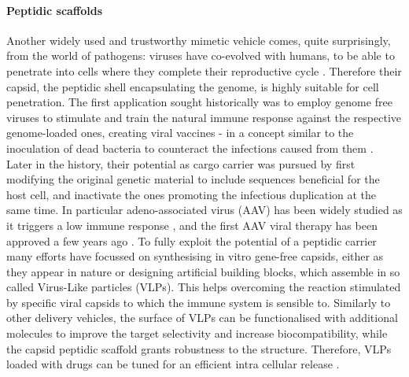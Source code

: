 \paragraph{Peptidic scaffolds} Another widely used and trustworthy mimetic vehicle comes, quite surprisingly, from the world of pathogens: viruses have co-evolved with humans, to be able to penetrate into cells where they complete their reproductive cycle \cite{Lobo2009}. Therefore their capsid, the peptidic shell encapsulating the genome, is highly suitable for cell penetration. The first application sought historically was to employ genome free viruses to stimulate and train the natural immune response against the respective genome-loaded ones, creating viral vaccines - in a concept similar to the inoculation of dead bacteria to counteract the infections caused from them \cite{Lauer2017}.
Later in the history, their potential as cargo carrier was pursued by first modifying the original genetic material to include sequences beneficial for the host cell, and inactivate the ones promoting the infectious duplication at the same time. In particular adeno-associated virus (AAV) has been widely studied \cite{Daya2008} as it triggers a low immune response \cite{Buning2015}, and the first AAV viral therapy has been approved a few years ago \cite{Smalley2017}.
%
To fully exploit the potential of a peptidic carrier many efforts have focussed on synthesising in vitro gene-free capsids, either as they appear in nature \cite{Wu2009} or designing artificial building blocks, which assemble in so called Virus-Like particles (VLPs). This helps overcoming the reaction stimulated by specific viral capsids to which the immune system is sensible to.
%
Similarly to other delivery vehicles, the surface of VLPs can be functionalised with additional molecules to improve the target selectivity and increase biocompatibility, while the capsid peptidic scaffold grants robustness to the structure. Therefore, VLPs loaded with drugs can be tuned for an efficient intra cellular release \cite{Ma2012}.

